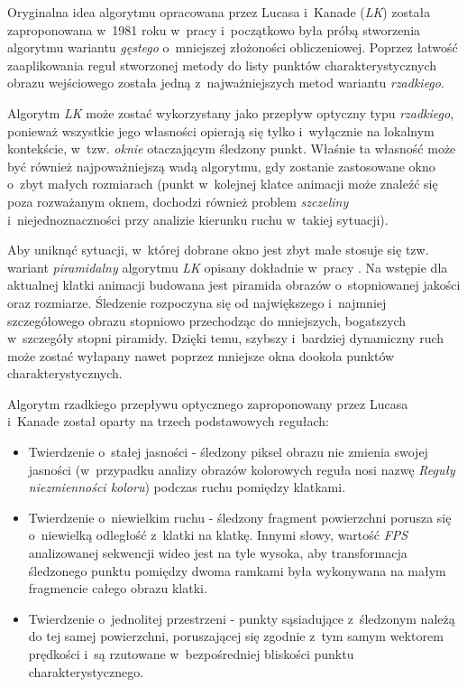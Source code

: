       Oryginalna idea algorytmu opracowana przez Lucasa i~Kanade (\textit{LK}) została zaproponowana w~1981 roku w~pracy \cite{LucasKanadeTracker81} i~początkowo była próbą stworzenia algorytmu wariantu \textit{gęstego} o~mniejszej złożoności obliczeniowej. Poprzez łatwość zaaplikowania reguł stworzonej metody do listy punktów charakterystycznych obrazu wejściowego została jedną z~najważniejszych metod wariantu \textit{rzadkiego}.

      Algorytm \textit{LK} może zostać wykorzystany jako przepływ optyczny typu \textit{rzadkiego}, ponieważ wszystkie jego własności opierają się tylko i~wyłącznie na lokalnym kontekście, w~tzw. \textit{oknie} otaczającym śledzony punkt. Właśnie ta własność może być również najpoważniejszą wadą algorytmu, gdy zostanie zastosowane okno o~zbyt małych rozmiarach (punkt w~kolejnej klatce animacji może znaleźć się poza rozważanym oknem, dochodzi również problem \textit{szczeliny} i~niejednoznaczności przy analizie kierunku ruchu w~takiej sytuacji).

      Aby uniknąć sytuacji, w~której dobrane okno jest zbyt małe stosuje się tzw. wariant \textit{piramidalny} algorytmu \textit{LK} opisany dokładnie w~pracy \cite{OpenCvOpticalFlow04}. Na wstępie dla aktualnej klatki animacji budowana jest piramida obrazów o~stopniowanej jakości oraz rozmiarze. Śledzenie rozpoczyna się od największego i~najmniej szczegółowego obrazu stopniowo przechodząc do mniejszych, bogatszych w~szczegóły stopni piramidy. Dzięki temu, szybszy i~bardziej dynamiczny ruch może zostać wyłapany nawet poprzez mniejsze okna dookoła punktów charakterystycznych.

      Algorytm rzadkiego przepływu optycznego zaproponowany przez Lucasa i~Kanade został oparty na trzech podstawowych regułach:
        \begin{itemize}
          \item Twierdzenie o~stałej jasności - śledzony piksel obrazu nie zmienia swojej jasności (w~przypadku analizy obrazów kolorowych reguła nosi nazwę \textit{Reguły niezmienności koloru}) podczas ruchu pomiędzy klatkami.
          \item Twierdzenie o~niewielkim ruchu - śledzony fragment powierzchni porusza się o~niewielką odległość z~klatki na klatkę. Innymi słowy, wartość \textit{FPS} analizowanej sekwencji wideo jest na tyle wysoka, aby transformacja śledzonego punktu pomiędzy dwoma ramkami była wykonywana na małym fragmencie całego obrazu klatki.
          \item Twierdzenie o~jednolitej przestrzeni - punkty sąsiadujące z~śledzonym należą do tej samej powierzchni, poruszającej się zgodnie z~tym samym wektorem prędkości i~są rzutowane w~bezpośredniej bliskości punktu charakterystycznego.
        \end{itemize}

